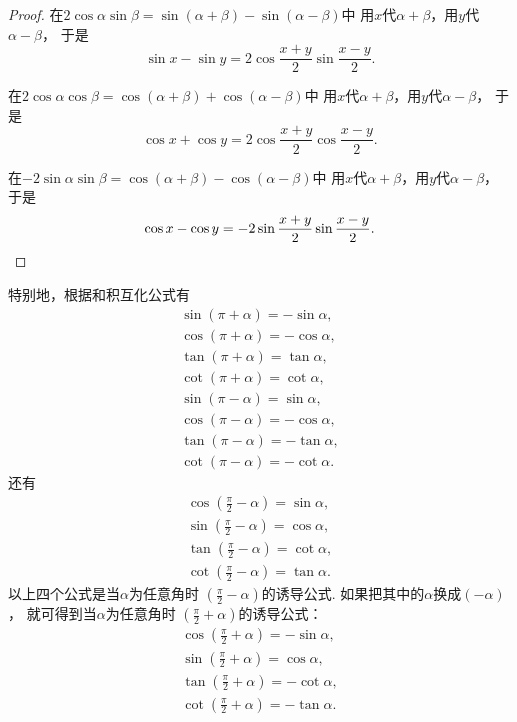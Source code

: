 \begin{theorem}[和积互化公式]
\begin{proof}
在\(2\cos\alpha\sin\beta = \sin(\alpha+\beta) - \sin(\alpha-\beta)\)中
用\(x\)代\(\alpha+\beta\)，用\(y\)代\(\alpha-\beta\)，
于是\[
	\sin x - \sin y = 2 \cos\frac{x+y}2 \sin\frac{x-y}2.
\]

在\(2\cos\alpha\cos\beta = \cos(\alpha+\beta) + \cos(\alpha-\beta)\)中
用\(x\)代\(\alpha+\beta\)，用\(y\)代\(\alpha-\beta\)，
于是\[
	\cos x + \cos y = 2 \cos\frac{x+y}2 \cos\frac{x-y}2.
\]

在\(-2\sin\alpha\sin\beta = \cos(\alpha+\beta) - \cos(\alpha-\beta)\)中
用\(x\)代\(\alpha+\beta\)，用\(y\)代\(\alpha-\beta\)，
于是\[
	\cos x - \cos y = -2 \sin\frac{x+y}2 \sin\frac{x-y}2.
	\qedhere
\]
\end{proof}
\end{theorem}

特别地，根据和积互化公式有\begin{gather}
	\sin(\pi+\alpha) = -\sin\alpha,
		\label{equation:函数.三角函数.诱导公式1} \\
	\cos(\pi+\alpha) = -\cos\alpha,
		\label{equation:函数.三角函数.诱导公式2} \\
	\tan(\pi+\alpha) = \tan\alpha,
		\label{equation:函数.三角函数.诱导公式3} \\
	\cot(\pi+\alpha) = \cot\alpha,
		\label{equation:函数.三角函数.诱导公式4} \\
	\sin(\pi-\alpha) = \sin\alpha,
		\label{equation:函数.三角函数.诱导公式5} \\
	\cos(\pi-\alpha) = -\cos\alpha,
		\label{equation:函数.三角函数.诱导公式6} \\
	\tan(\pi-\alpha) = -\tan\alpha,
		\label{equation:函数.三角函数.诱导公式7} \\
	\cot(\pi-\alpha) = -\cot\alpha.
		\label{equation:函数.三角函数.诱导公式8}
\end{gather}
还有\begin{gather}
	\cos\left(\frac{\pi}{2}-\alpha\right) = \sin\alpha,
		\label{equation:函数.三角函数.诱导公式9} \\
	\sin\left(\frac{\pi}{2}-\alpha\right) = \cos\alpha,
		\label{equation:函数.三角函数.诱导公式10} \\
	\tan\left(\frac{\pi}{2}-\alpha\right) = \cot\alpha,
		\label{equation:函数.三角函数.诱导公式11} \\
	\cot\left(\frac{\pi}{2}-\alpha\right) = \tan\alpha.
		\label{equation:函数.三角函数.诱导公式12}
\end{gather}
以上四个公式是当\(\alpha\)为任意角时
\(\left(\frac{\pi}{2}-\alpha\right)\)的诱导公式.
如果把其中的\(\alpha\)换成\((-\alpha)\)，
就可得到当\(\alpha\)为任意角时
\(\left(\frac{\pi}{2}+\alpha\right)\)的诱导公式：
\begin{gather}
	\cos\left(\frac{\pi}{2}+\alpha\right) = -\sin\alpha,
		\label{equation:函数.三角函数.诱导公式13} \\
	\sin\left(\frac{\pi}{2}+\alpha\right) = \cos\alpha,
		\label{equation:函数.三角函数.诱导公式14} \\
	\tan\left(\frac{\pi}{2}+\alpha\right) = -\cot\alpha,
		\label{equation:函数.三角函数.诱导公式15} \\
	\cot\left(\frac{\pi}{2}+\alpha\right) = -\tan\alpha.
		\label{equation:函数.三角函数.诱导公式16}
\end{gather}


